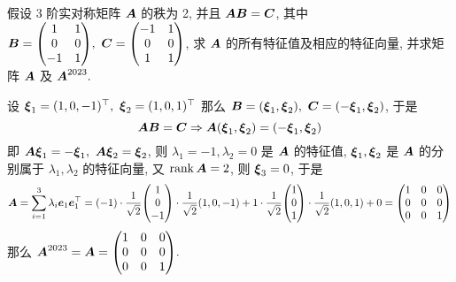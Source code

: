 \begin{example}
    假设 3 阶实对称矩阵 $\vb*{A}$ 的秩为 2, 并且 $\vb*{AB}=\vb*{C}$, 其中 $\vb*{B}=\mqty(1&1\\0&0\\-1&1),~\vb*{C}=\mqty(-1&1\\0&0\\1&1)$, 求 $\vb*{A}$ 的所有特征值及相应的特征向量, 并求矩阵 $\vb*{A}$ 及 $\vb*{A}^{2023}.$
\end{example}
\begin{solution}
    设 $\vb*{\xi}_1=(1,0,-1)^\top,~\vb*{\xi}_2=(1,0,1)^\top$ 那么 $\vb*{B}=(\vb*{\xi}_1,\vb*{\xi}_2),~\vb*{C}=(-\vb*{\xi}_1,\vb*{\xi}_2)$, 于是 $$\vb*{AB}=\vb*{C}\Rightarrow \vb*{A}(\vb*{\xi}_1,\vb*{\xi}_2)=(-\vb*{\xi}_1,\vb*{\xi}_2)$$
    即 $\vb*{A\xi}_1=-\vb*{\xi}_1,~\vb*{A\xi}_2=\vb*{\xi}_2$, 则 $\lambda_1=-1,\lambda_2=0$ 是 $\vb*{A}$ 的特征值, $\vb*{\xi}_1,\vb*{\xi}_2$ 是 $\vb*{A}$ 的分别属于 $\lambda_1,\lambda_2$ 的特征向量, 又 $\rank\vb*{A}=2$, 则 $\vb*{\xi}_3=0$, 于是
    $$\vb*{A}=\sum_{i=1}^{3}\lambda_i\vb*{e}_1\vb*{e}_1^\top=(-1)\cdot\dfrac{1}{\sqrt{2}}\mqty(1\\0\\-1)\cdot\dfrac{1}{\sqrt{2}}(1,0,-1)+1\cdot\dfrac{1}{\sqrt{2}}\mqty(1\\0\\1)\cdot\dfrac{1}{\sqrt{2}}(1,0,1)+0=\mqty(1&0&0\\0&0&0\\0&0&1)$$
    那么 $\vb*{A}^{2023}=\vb*{A}=\mqty(1&0&0\\0&0&0\\0&0&1).$
\end{solution}

